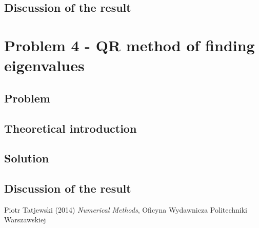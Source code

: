 \documentclass{report}
\begin{document}
\section{Discussion of the result}
\chapter{Problem 4 - QR method of finding eigenvalues}

\section{Problem}

\section{Theoretical introduction}

\section{Solution}

\section{Discussion of the result}

\begin{thebibliography}{9}
Piotr Tatjewski (2014) \emph{Numerical Methods}, Oficyna Wydawnicza Politechniki Warszawskiej
\end{thebibliography}
\end{document}
